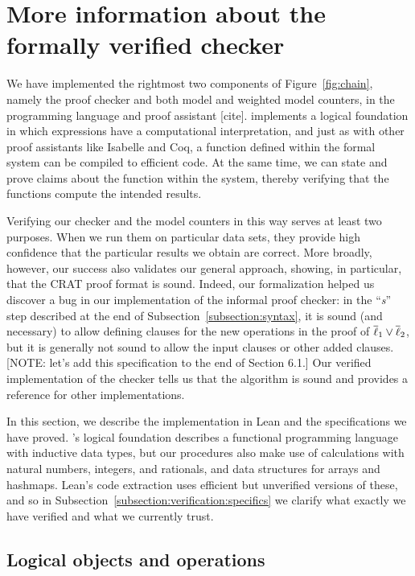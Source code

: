 \section{More information about the formally verified checker}
\label{appendix:lean}

We have implemented the rightmost two components of Figure~\ref{fig:chain}, namely the
proof checker and both model and weighted model counters, in the \lean{} programming language
and proof assistant [cite]. \lean{} implements a logical foundation in which expressions
have a computational interpretation, and just as with other proof assistants like Isabelle and Coq,
a function defined within the formal system can be compiled to efficient code.
At the same time, we can state and prove claims about the function within the system, thereby
verifying that the functions compute the intended results.

Verifying our checker and the model counters in this way serves at least two purposes.
When we run them on particular data sets, they provide high confidence
that the particular results we obtain are correct.
More broadly, however, our success also validates our general approach,
showing, in particular, that the CRAT proof format is sound.
Indeed, our formalization helped us discover a bug in our implementation
of the informal proof checker: in the ``\emph{s}'' step described at the end of
Subsection~\ref{subsection:syntax}, it is sound (and necessary) to allow defining
clauses for the new operations in the proof of $\overline{\ell}_1 \lor \overline{\ell}_2$,
but it is generally not sound to allow the input clauses or other added clauses.
[NOTE: let's add this specification to the end of Section 6.1.]
Our verified implementation of the checker tells us that the algorithm is sound and
provides a reference for other implementations.

In this section, we describe the implementation in Lean and the specifications we have proved.
\lean{}'s logical foundation describes a functional programming language with
inductive data types,
but our procedures also make use of calculations with natural numbers, integers, and rationals,
and data structures for arrays and hashmaps.
Lean's code extraction uses efficient but unverified versions of these,
and so in Subsection~\ref{subsection:verification:specifics} we clarify
what exactly we have verified and what we currently trust.

\subsection{Logical objects and operations}

